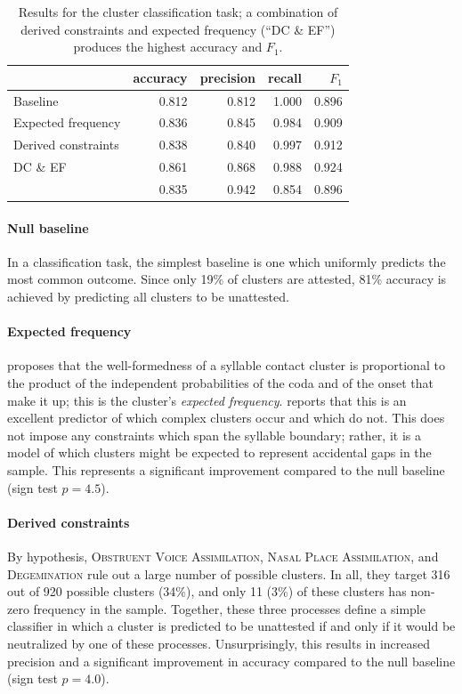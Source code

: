 \begin{table}[ht]
\centering
\begin{tabular}{l | rrrr}
\toprule
                    & accuracy & precision & recall & $F_1$ \\
\midrule
Baseline            & 0.812    & 0.812     & 1.000  & 0.896 \\
Expected frequency  & 0.836    & 0.845     & 0.984  & 0.909 \\
Derived constraints & 0.838    & 0.840     & 0.997  & 0.912 \\
DC \& EF            & 0.861    & 0.868     & 0.988  & 0.924 \\
\citet{Hayes2008a}  & 0.835    & 0.942     & 0.854  & 0.896 \\
\bottomrule
\end{tabular}
\caption{Results for the cluster classification task; a combination of derived constraints and expected frequency (``DC \& EF'') produces the highest accuracy and $F_1$.}
\label{cmresults}
\end{table}

\paragraph{Null baseline} 
In a classification task, the simplest baseline is one which uniformly predicts the most common outcome. 
Since only 19\% of clusters are attested, 
81\% accuracy is achieved by predicting all clusters to be unattested.

\paragraph{Expected frequency} 
\citet{Pierrehumbert1994} proposes that the well-formedness of a syllable contact cluster is proportional to the product of the independent probabilities of the coda and of the onset that make it up; this is the cluster's \emph{expected frequency}. 
\citeauthor{Pierrehumbert1994} reports that this is an excellent predictor of which complex clusters occur and which do not. 
This does not impose any constraints which span the syllable boundary; rather, it is a model of which clusters might be expected to represent accidental gaps in the sample.
This represents a significant improvement compared to the null baseline (sign test $p = 4.5$).

\paragraph{Derived constraints} 
By hypothesis, \textsc{Obstruent Voice Assimilation}, \textsc{Nasal Place Assimilation}, and \textsc{Degemination} rule out a large number of possible clusters. 
In all, they target 316 out of 920 possible clusters (34\%), and only 11 (3\%) of these clusters has non-zero frequency in the sample.
Together, these three processes define a simple classifier in which a cluster is predicted to be unattested if and only if it would be neutralized by one of these processes. 
Unsurprisingly, this results in increased precision and a significant improvement in accuracy compared to the null baseline (sign test $p = 4.0$). 

